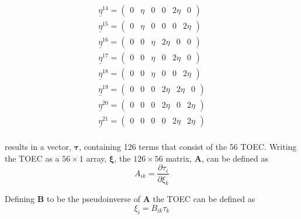 \documentclass[showpacs,aps,floatfix,prb,reprint,superscriptaddress,onecolumn]{revtex4-1}
\begin{document}
\begin{enumerate}
\begin{widetext}
\begin{subequations}
\begin{align}
    	\underline{\eta}^{14} =\left(\begin{matrix} 0 & \eta & 0 & 0 & 2\eta & 0 \end{matrix}\right)\\
    	\underline{\eta}^{15} =\left(\begin{matrix} 0 & \eta & 0 & 0 & 0 & 2\eta \end{matrix}\right)\\
    	\underline{\eta}^{16} =\left(\begin{matrix} 0 & 0 & \eta & 2\eta & 0 & 0 \end{matrix}\right)\\
    	\underline{\eta}^{17} =\left(\begin{matrix} 0 & 0 & \eta & 0 & 2\eta & 0 \end{matrix}\right)\\
    	\underline{\eta}^{18} =\left(\begin{matrix} 0 & 0 & \eta & 0 & 0 & 2\eta \end{matrix}\right)\\
    	\underline{\eta}^{19} =\left(\begin{matrix} 0 & 0 & 0 & 2\eta & 2\eta & 0 \end{matrix}\right)\\
    	\underline{\eta}^{20} =\left(\begin{matrix} 0 & 0 & 0 & 2\eta & 0 & 2\eta \end{matrix}\right)\\
    	\underline{\eta}^{21} =\left(\begin{matrix} 0 & 0 & 0 & 0 & 2\eta & 2\eta \end{matrix}\right)\\
\end{align}
\end{subequations}
\end{widetext} 

results in a vector, $\mathbf{\tau}$, containing 126 terms that consist of the 56 TOEC.  Writing the TOEC as a $56\times1$ array, $\mathbf{\xi}$, the $126\times56$ matrix, $\mathbf{A}$, can be defined as
\begin{equation}
A_{ik} = \frac{\partial \tau_i}{\partial \xi_k}
\end{equation}

Defining $\mathbf{B}$ to be the pseudoinverse of $\mathbf{A}$ the TOEC can be defined as
\begin{equation}
\xi_i = B_{i k} \tau_k
\end{equation}


\end{enumerate}
\end{document}
